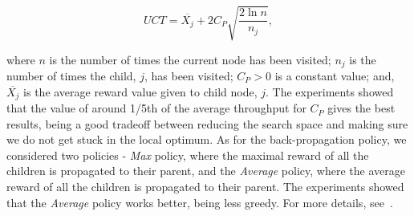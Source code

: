 \documentclass[smallextended]{svjour3}
\begin{document}
$$UCT= \overline{X_j} + 2C_P\sqrt{\frac{2\ln n}{n_j}},$$

\noindent
where $n$ is the number of times the current node has been visited; $n_j$ is the number of times the child, $j$, has been visited;
$C_P>0$ is a constant value; and, $\overline{X_j}$ is the average
reward value given to child node, $j$. The experiments showed that the
value of around 1/5th of the average throughput for $C_P$ gives the
best results, being a good tradeoff between reducing the search space
and making sure we do not get stuck in the local optimum. As for the back-propagation
policy, we considered two policies - \emph{Max} policy, where the
maximal reward of all the children is propagated to their parent, and
the \emph{Average} policy, where the average reward of all the
children is propagated to their parent. The experiments showed that
the \emph{Average} policy works better, being less greedy. For more
details, see~\cite{cec2013}.









\end{document}
